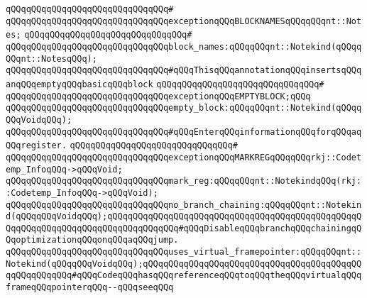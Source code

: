 \verb|qQQqqQQqqQQqqQQqqQQqqQQqqQQqqQQq#|\newline
\verb|qQQqqQQqqQQqqQQqqQQqqQQqqQQqqQQqexceptionqQQqBLOCKNAMESqQQqqQQqnt::Notes;|\newline
\verb|qQQqqQQqqQQqqQQqqQQqqQQqqQQqqQQq#|\newline
\verb|qQQqqQQqqQQqqQQqqQQqqQQqqQQqqQQqblock_names:qQQqqQQqnt::Notekind(qQQqqQQqnt::NotesqQQq);|\newline
\newline
\newline
\verb|qQQqqQQqqQQqqQQqqQQqqQQqqQQqqQQq#qQQqThisqQQqannotationqQQqinsertsqQQqanqQQqemptyqQQqbasicqQQqblock|\newline
\verb|qQQqqQQqqQQqqQQqqQQqqQQqqQQqqQQq#|\newline
\verb|qQQqqQQqqQQqqQQqqQQqqQQqqQQqqQQqexceptionqQQqEMPTYBLOCK;qQQq|\newline
\verb|qQQqqQQqqQQqqQQqqQQqqQQqqQQqqQQqempty_block:qQQqqQQqnt::Notekind(qQQqqQQqVoidqQQq);|\newline
\newline
\newline
\verb|qQQqqQQqqQQqqQQqqQQqqQQqqQQqqQQq#qQQqEnterqQQqinformationqQQqforqQQqaqQQqregister.|\newline
\verb|qQQqqQQqqQQqqQQqqQQqqQQqqQQqqQQq#|\newline
\verb|qQQqqQQqqQQqqQQqqQQqqQQqqQQqqQQqexceptionqQQqMARKREGqQQqqQQqrkj::Codetemp_InfoqQQq->qQQqVoid;|\newline
\verb|qQQqqQQqqQQqqQQqqQQqqQQqqQQqqQQqmark_reg:qQQqqQQqnt::NotekindqQQq(rkj::Codetemp_InfoqQQq->qQQqVoid);|\newline
\newline
\newline
\verb|qQQqqQQqqQQqqQQqqQQqqQQqqQQqqQQqno_branch_chaining:qQQqqQQqnt::Notekind(qQQqqQQqVoidqQQq);qQQqqQQqqQQqqQQqqQQqqQQqqQQqqQQqqQQqqQQqqQQqqQQqqQQqqQQqqQQqqQQqqQQqqQQqqQQqqQQqqQQq#qQQqDisableqQQqbranchqQQqchainingqQQqoptimizationqQQqonqQQqaqQQqjump.|\newline
\newline
\verb|qQQqqQQqqQQqqQQqqQQqqQQqqQQqqQQquses_virtual_framepointer:qQQqqQQqnt::Notekind(qQQqqQQqVoidqQQq);qQQqqQQqqQQqqQQqqQQqqQQqqQQqqQQqqQQqqQQqqQQqqQQqqQQqqQQq#qQQqCodeqQQqhasqQQqreferenceqQQqtoqQQqtheqQQqvirtualqQQqframeqQQqpointerqQQq--qQQqseeqQQq|\newline
